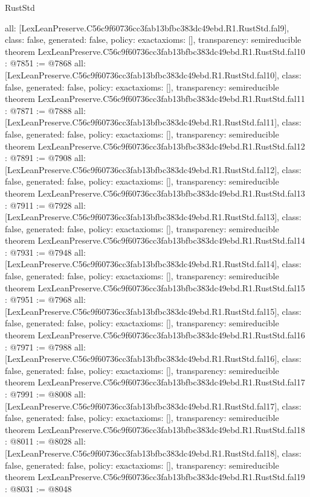 \begin{lexlean}{RustStd}
\begin{coremodule}
{  all: [LexLeanPreserve.C56c9f60736cc3fab13bfbc383dc49ebd.R1.RustStd.fal9],
  class: false,
  generated: false,
  policy: exact{axioms: []},
  transparency: semireducible
}
theorem LexLeanPreserve.C56c9f60736cc3fab13bfbc383dc49ebd.R1.RustStd.fal10 : @7851 := @7868 {
  all: [LexLeanPreserve.C56c9f60736cc3fab13bfbc383dc49ebd.R1.RustStd.fal10],
  class: false,
  generated: false,
  policy: exact{axioms: []},
  transparency: semireducible
}
theorem LexLeanPreserve.C56c9f60736cc3fab13bfbc383dc49ebd.R1.RustStd.fal11 : @7871 := @7888 {
  all: [LexLeanPreserve.C56c9f60736cc3fab13bfbc383dc49ebd.R1.RustStd.fal11],
  class: false,
  generated: false,
  policy: exact{axioms: []},
  transparency: semireducible
}
theorem LexLeanPreserve.C56c9f60736cc3fab13bfbc383dc49ebd.R1.RustStd.fal12 : @7891 := @7908 {
  all: [LexLeanPreserve.C56c9f60736cc3fab13bfbc383dc49ebd.R1.RustStd.fal12],
  class: false,
  generated: false,
  policy: exact{axioms: []},
  transparency: semireducible
}
theorem LexLeanPreserve.C56c9f60736cc3fab13bfbc383dc49ebd.R1.RustStd.fal13 : @7911 := @7928 {
  all: [LexLeanPreserve.C56c9f60736cc3fab13bfbc383dc49ebd.R1.RustStd.fal13],
  class: false,
  generated: false,
  policy: exact{axioms: []},
  transparency: semireducible
}
theorem LexLeanPreserve.C56c9f60736cc3fab13bfbc383dc49ebd.R1.RustStd.fal14 : @7931 := @7948 {
  all: [LexLeanPreserve.C56c9f60736cc3fab13bfbc383dc49ebd.R1.RustStd.fal14],
  class: false,
  generated: false,
  policy: exact{axioms: []},
  transparency: semireducible
}
theorem LexLeanPreserve.C56c9f60736cc3fab13bfbc383dc49ebd.R1.RustStd.fal15 : @7951 := @7968 {
  all: [LexLeanPreserve.C56c9f60736cc3fab13bfbc383dc49ebd.R1.RustStd.fal15],
  class: false,
  generated: false,
  policy: exact{axioms: []},
  transparency: semireducible
}
theorem LexLeanPreserve.C56c9f60736cc3fab13bfbc383dc49ebd.R1.RustStd.fal16 : @7971 := @7988 {
  all: [LexLeanPreserve.C56c9f60736cc3fab13bfbc383dc49ebd.R1.RustStd.fal16],
  class: false,
  generated: false,
  policy: exact{axioms: []},
  transparency: semireducible
}
theorem LexLeanPreserve.C56c9f60736cc3fab13bfbc383dc49ebd.R1.RustStd.fal17 : @7991 := @8008 {
  all: [LexLeanPreserve.C56c9f60736cc3fab13bfbc383dc49ebd.R1.RustStd.fal17],
  class: false,
  generated: false,
  policy: exact{axioms: []},
  transparency: semireducible
}
theorem LexLeanPreserve.C56c9f60736cc3fab13bfbc383dc49ebd.R1.RustStd.fal18 : @8011 := @8028 {
  all: [LexLeanPreserve.C56c9f60736cc3fab13bfbc383dc49ebd.R1.RustStd.fal18],
  class: false,
  generated: false,
  policy: exact{axioms: []},
  transparency: semireducible
}
theorem LexLeanPreserve.C56c9f60736cc3fab13bfbc383dc49ebd.R1.RustStd.fal19 : @8031 := @8048 {
}
\end{coremodule}
\end{lexlean}
